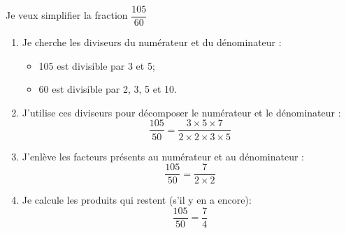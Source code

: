 \begin{mymeth}
	Je veux simplifier la fraction $\dfrac{105}{60}$
	
	\begin{enumerate}
		\item Je cherche les diviseurs du numérateur et du dénominateur :
		\begin{itemize}
			\item 105 est divisible par 3 et 5;
			\item 60 est divisible par 2, 3, 5 et 10.
		\end{itemize}
		\item J'utilise ces diviseurs pour décomposer le numérateur et le dénominateur :
		\begin{equation*}
		\frac{105}{50} = \frac{3 \times 5 \times 7}{2 \times 2 \times 3 \times 5 }
		\end{equation*}
		\item J'enlève les facteurs présents au numérateur et au dénominateur :
		\begin{equation*}
		\frac{105}{50} = \frac{7}{2 \times 2}		
		\end{equation*}
		
		\item Je calcule les produits qui restent (s'il y en a encore):
		\begin{equation*}
		\frac{105}{50} = \frac{7}{4}		
		\end{equation*}
		
	\end{enumerate}
	
	
\end{mymeth}
